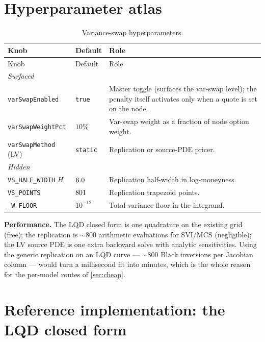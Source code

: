 \documentclass[11pt]{article}
\begin{document}
\appendix
\section{Hyperparameter atlas}
\label{app:atlas}

\begin{longtable}{p{}p{}p{}}
\caption{Variance-swap hyperparameters.}\label{tab:atlas}\\
\toprule Knob & Default & Role\\ \midrule
\endfirsthead \toprule Knob & Default & Role\\ \midrule \endhead
\multicolumn{3}{l}{\emph{Surfaced}}\\ \midrule
\texttt{varSwapEnabled} & \texttt{true} & Master toggle (surfaces the var-swap
level); the penalty itself activates only when a quote is set on the node.\\
\texttt{varSwapWeightPct} & $10\%$ & Var-swap weight as a fraction of node option weight.\\
\texttt{varSwapMethod} (LV) & \texttt{static} & Replication or source-PDE pricer.\\
\midrule
\multicolumn{3}{l}{\emph{Hidden}}\\ \midrule
\texttt{VS\_HALF\_WIDTH} $H$ & $6.0$ & Replication half-width in log-moneyness.\\
\texttt{VS\_POINTS} & $801$ & Replication trapezoid points.\\
\texttt{\_W\_FLOOR} & $10^{-12}$ & Total-variance floor in the integrand.\\
\bottomrule
\end{longtable}

\noindent\textbf{Performance.} The LQD closed form is one quadrature on the
existing grid (free); the replication is $\sim800$ arithmetic evaluations for
SVI/MCS (negligible); the LV source PDE is one extra backward solve with analytic
sensitivities. Using the generic replication on an LQD curve --- $\sim800$ Black
inversions per Jacobian column --- would turn a millisecond fit into minutes, which
is the whole reason for the per-model routes of \cref{sec:cheap}.

\section{Reference implementation: the LQD closed form}
\label{app:ref}
\end{document}
